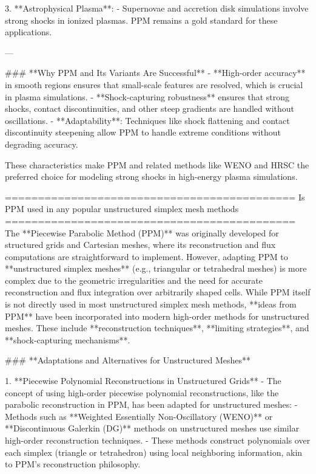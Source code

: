 3. **Astrophysical Plasma**:
   - Supernovae and accretion disk simulations involve strong shocks in ionized plasmas. PPM remains a gold standard for these applications.

---

### **Why PPM and Its Variants Are Successful**
- **High-order accuracy** in smooth regions ensures that small-scale features are resolved, which is crucial in plasma simulations.
- **Shock-capturing robustness** ensures that strong shocks, contact discontinuities, and other steep gradients are handled without oscillations.
- **Adaptability**: Techniques like shock flattening and contact discontinuity steepening allow PPM to handle extreme conditions without degrading accuracy.

These characteristics make PPM and related methods like WENO and HRSC the preferred choice for modeling strong shocks in high-energy plasma simulations.


============================================
Is PPM used in any popular unstructured simplex mesh methods
============================================
The **Piecewise Parabolic Method (PPM)** was originally developed for structured grids and Cartesian meshes, where its reconstruction and flux computations are straightforward to implement. However, adapting PPM to **unstructured simplex meshes** (e.g., triangular or tetrahedral meshes) is more complex due to the geometric irregularities and the need for accurate reconstruction and flux integration over arbitrarily shaped cells. While PPM itself is not directly used in most unstructured simplex mesh methods, **ideas from PPM** have been incorporated into modern high-order methods for unstructured meshes. These include **reconstruction techniques**, **limiting strategies**, and **shock-capturing mechanisms**.

### **Adaptations and Alternatives for Unstructured Meshes**

1. **Piecewise Polynomial Reconstructions in Unstructured Grids**
   - The concept of using high-order piecewise polynomial reconstructions, like the parabolic reconstruction in PPM, has been adapted for unstructured meshes:
     - Methods such as **Weighted Essentially Non-Oscillatory (WENO)** or **Discontinuous Galerkin (DG)** methods on unstructured meshes use similar high-order reconstruction techniques.
     - These methods construct polynomials over each simplex (triangle or tetrahedron) using local neighboring information, akin to PPM's reconstruction philosophy.

